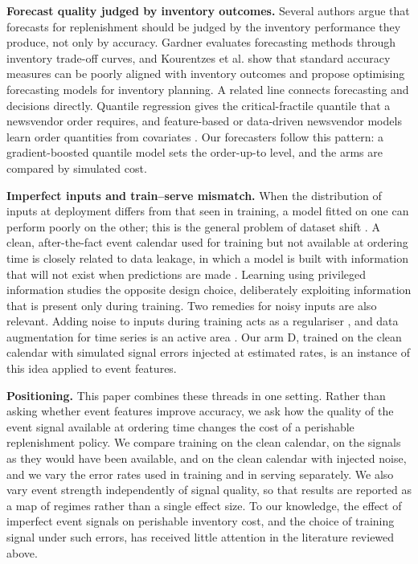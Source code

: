 \textbf{Forecast quality judged by inventory outcomes.} Several authors argue that forecasts for replenishment should be judged by the inventory performance they produce, not only by accuracy. Gardner \cite{gardner1990evaluating} evaluates forecasting methods through inventory trade-off curves, and Kourentzes et al. \cite{kourentzes2020optimising} show that standard accuracy measures can be poorly aligned with inventory outcomes and propose optimising forecasting models for inventory planning. A related line connects forecasting and decisions directly. Quantile regression \cite{koenker1978regression} gives the critical-fractile quantile that a newsvendor order requires, and feature-based or data-driven newsvendor models learn order quantities from covariates \cite{ban2019big, huber2019data, bertsimas2020predictive}. Our forecasters follow this pattern: a gradient-boosted quantile model sets the order-up-to level, and the arms are compared by simulated cost.

\textbf{Imperfect inputs and train--serve mismatch.} When the distribution of inputs at deployment differs from that seen in training, a model fitted on one can perform poorly on the other; this is the general problem of dataset shift \cite{quinonero2009dataset}. A clean, after-the-fact event calendar used for training but not available at ordering time is closely related to data leakage, in which a model is built with information that will not exist when predictions are made \cite{kaufman2012leakage}. Learning using privileged information \cite{vapnik2009new} studies the opposite design choice, deliberately exploiting information that is present only during training. Two remedies for noisy inputs are also relevant. Adding noise to inputs during training acts as a regulariser \cite{bishop1995training}, and data augmentation for time series is an active area \cite{wen2021time}. Our arm D, trained on the clean calendar with simulated signal errors injected at estimated rates, is an instance of this idea applied to event features.

\textbf{Positioning.} This paper combines these threads in one setting. Rather than asking whether event features improve accuracy, we ask how the quality of the event signal available at ordering time changes the cost of a perishable replenishment policy. We compare training on the clean calendar, on the signals as they would have been available, and on the clean calendar with injected noise, and we vary the error rates used in training and in serving separately. We also vary event strength independently of signal quality, so that results are reported as a map of regimes rather than a single effect size. To our knowledge, the effect of imperfect event signals on perishable inventory cost, and the choice of training signal under such errors, has received little attention in the literature reviewed above.

